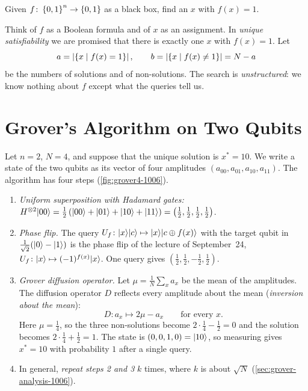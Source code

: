 
\begin{problem}
    Given $f \colon \left\lbrace0,1\right\rbrace^n \to \left\lbrace0,1\right\rbrace$ as a black box, find an $x$ with $f(x) = 1$.
\end{problem}

Think of $f$ as a Boolean formula and of $x$ as an assignment. In \emph{unique satisfiability} we are
promised that there is exactly one $x$ with $f(x) = 1$. Let
\[a = \left\lvert\left\lbrace x \mid f(x) = 1\right\rbrace\right\rvert, \qquad b = \left\lvert\left\lbrace x \mid f(x) \neq 1\right\rbrace\right\rvert = N - a\]
be the numbers of solutions and of non-solutions. The search is \emph{unstructured}: we know nothing
about $f$ except what the queries tell us.

\section{Grover's Algorithm on Two Qubits}

Let $n = 2$, $N = 4$, and suppose that the unique solution is $x^* = 10$. We write a state of the two
qubits as its vector of four amplitudes $(a_{00}, a_{01}, a_{10}, a_{11})$. The algorithm has four
steps (\cref{fig:grover4-1006}).

\begin{enumerate}
    \item \emph{Uniform superposition with Hadamard gates:}
          $H^{\otimes 2} \lvert 00 \rangle = \frac{1}{2}\left(\lvert 00 \rangle + \lvert 01 \rangle + \lvert 10 \rangle + \lvert 11 \rangle\right)
              = \left(\tfrac{1}{2}, \tfrac{1}{2}, \tfrac{1}{2}, \tfrac{1}{2}\right)$.
    \item \emph{Phase flip.} The query $U_f \colon \lvert x \rangle\lvert c \rangle \mapsto \lvert x \rangle\lvert c \oplus f(x) \rangle$
          with the target qubit in $\frac{1}{\sqrt{2}}(\lvert 0 \rangle - \lvert 1 \rangle)$ is the phase flip of the
          lecture of September~24, $U_f \colon \lvert x \rangle \mapsto (-1)^{f(x)} \lvert x \rangle$. One query gives
          $\left(\tfrac{1}{2}, \tfrac{1}{2}, -\tfrac{1}{2}, \tfrac{1}{2}\right)$.
    \item \emph{Grover diffusion operator.} Let $\mu = \frac{1}{N} \sum_{x} a_x$ be the mean of the
          amplitudes. The diffusion operator $D$ reflects every amplitude about the mean
          (\emph{inversion about the mean}):
          \[D \colon a_x \longmapsto 2\mu - a_x \qquad \text{for every } x.\]
          Here $\mu = \frac{1}{4}$, so the three non-solutions become $2 \cdot \frac{1}{4} - \frac{1}{2} = 0$
          and the solution becomes $2 \cdot \frac{1}{4} + \frac{1}{2} = 1$. The state is
          $(0, 0, 1, 0) = \lvert 10 \rangle$, so measuring gives $x^* = 10$ with probability $1$ after a
          single query.
    \item In general, \emph{repeat steps 2 and 3} $k$ times, where $k$ is about $\sqrt{N}$
          (\cref{sec:grover-analysis-1006}).
\end{enumerate}

